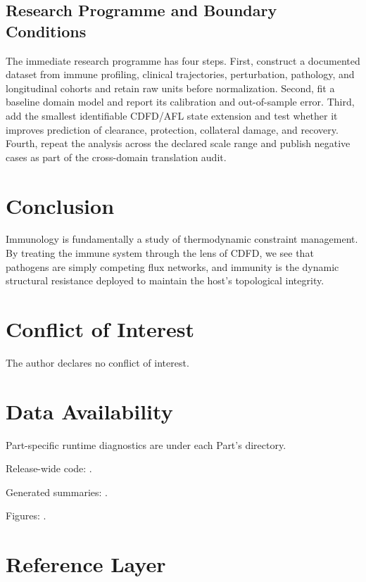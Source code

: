 \documentclass[11pt,a4paper]{article}
\begin{document}
\subsection{Research Programme and Boundary Conditions}

The immediate research programme has four steps. First, construct a documented
dataset from immune profiling, clinical trajectories, perturbation, pathology, and longitudinal cohorts and retain raw units before normalization.
Second, fit a baseline domain model and report its calibration and out-of-sample
error. Third, add the smallest identifiable CDFD/AFL state extension and test
whether it improves prediction of clearance, protection, collateral damage, and recovery. Fourth, repeat the
analysis across the declared scale range and publish negative cases as part of
the cross-domain translation audit.


\section{Conclusion}
Immunology is fundamentally a study of thermodynamic constraint management. By treating the immune system through the lens of CDFD, we see that pathogens are simply competing flux networks, and immunity is the dynamic structural resistance deployed to maintain the host's topological integrity.
\section*{Conflict of Interest} The author declares no conflict of interest.
\section*{Data Availability}
Part-specific runtime diagnostics are under each Part's  directory.

Release-wide code: .

Generated summaries: .

Figures: .


\section{Reference Layer}


\end{document}

